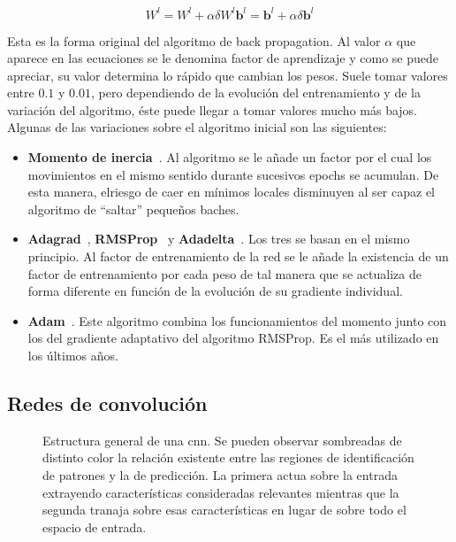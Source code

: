\begin{subequations}
	\begin{equation}
		W^l = W^l + \alpha \delta W^l \label{eq:error-applied-to-weights}
	\end{equation}
	\begin{equation}
		\mathbf{b}^l = \mathbf{b}^l + \alpha \delta \mathbf{b}^l \label{eq:error-applied-to-bias}
	\end{equation}
\end{subequations}

Esta es la forma original del algoritmo de back propagation. Al valor $\alpha$ que aparece en las ecuaciones se le denomina factor de aprendizaje y como se puede apreciar, su valor determina lo rápido que cambian los pesos. Suele tomar valores entre $0.1$ y $0.01$, pero dependiendo de la evolución del entrenamiento y de la variación del algoritmo, éste puede llegar a tomar valores mucho más bajos. Algunas de las variaciones sobre el algoritmo inicial son las siguientes:

\begin{itemize}
	\item \textbf{Momento de inercia}~\cite{qian1999momentum}. Al algoritmo se le añade un factor por el cual los movimientos en el mismo sentido durante sucesivos epochs se acumulan. De esta manera, elriesgo de caer en mínimos locales disminuyen al ser capaz el algoritmo de \enquote{saltar} pequeños baches.
	\item \textbf{Adagrad}~\cite{duchi2011adaptive}, \textbf{RMSProp}~\cite{tieleman2012lecture} y \textbf{Adadelta}~\cite{zeiler2012adadelta}. Los tres se basan en el mismo principio. Al factor de entrenamiento de la red se le añade la existencia de un factor de entrenamiento por cada peso de tal manera que se actualiza de forma diferente en función de la evolución de su gradiente individual.
	\item \textbf{Adam}~\cite{kingma2014adam}. Este algoritmo combina los funcionamientos del momento junto con los del gradiente adaptativo del algoritmo RMSProp. Es el más utilizado en los últimos años.
\end{itemize}

\subsection{Redes de convolución}

\begin{figure}[!b]
	\caption[Estructura general de una \acl{cnn}]{Estructura general de una \acl{cnn}. Se pueden observar sombreadas de distinto color la relación existente entre las regiones de identificación de patrones y la de predicción. La primera actua sobre la entrada extrayendo características consideradas relevantes mientras que la segunda tranaja sobre esas características en lugar de sobre todo el espacio de entrada.}
	\label{fig:cnn-general-structure}
\end{figure}

